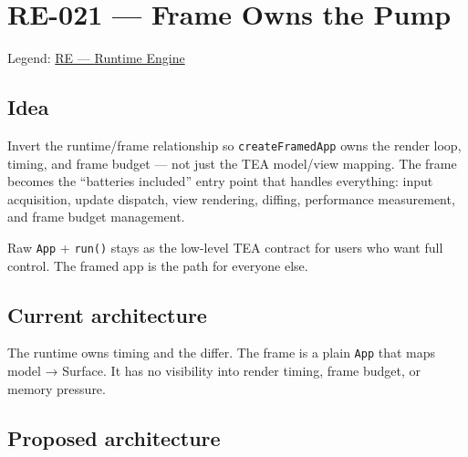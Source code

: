 \chapter{RE-021 --- Frame Owns the Pump}\label{record-372}

\smallskip

Legend: \href{https://github.com/flyingrobots/bijou/blob/cbd70612140e7a450d764b3c7be1c6af878b99bc/docs/method/graveyard/legends/RE-runtime-engine.md}{RE --- Runtime Engine}

\section{Idea}\label{record-372-idea}

Invert the runtime/frame relationship so \texttt{c\allowbreak{}r\allowbreak{}e\allowbreak{}a\allowbreak{}t\allowbreak{}e\allowbreak{}F\allowbreak{}r\allowbreak{}a\allowbreak{}m\allowbreak{}e\allowbreak{}d\allowbreak{}A\allowbreak{}p\allowbreak{}p} owns the render loop, timing, and frame budget --- not just the TEA model/view mapping. The frame becomes the ``batteries included'' entry point that handles everything: input acquisition, update dispatch, view rendering, diffing, performance measurement, and frame budget management.

Raw \texttt{A\allowbreak{}p\allowbreak{}p} + \texttt{r\allowbreak{}u\allowbreak{}n\allowbreak{}(\allowbreak{})} stays as the low-level TEA contract for users who want full control. The framed app is the path for everyone else.

\section{Current architecture}\label{record-372-current-architecture}



The runtime owns timing and the differ. The frame is a plain \texttt{A\allowbreak{}p\allowbreak{}p} that maps model → Surface. It has no visibility into render timing, frame budget, or memory pressure.

\section{Proposed architecture}\label{record-372-proposed-architecture}

